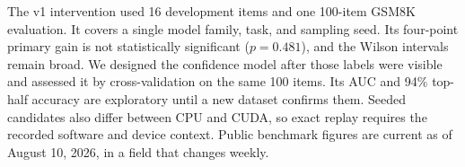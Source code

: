 The v1 intervention used 16 development items and one 100-item GSM8K
evaluation. It covers a single model family, task, and sampling seed. Its
four-point primary gain is not statistically significant ($p=0.481$), and the
Wilson intervals remain broad. We designed the confidence model after those
labels were visible and assessed it by cross-validation on the same 100 items.
Its AUC and 94\% top-half accuracy are exploratory until a new dataset confirms
them. Seeded candidates also differ between CPU and CUDA, so exact replay
requires the recorded software and device context. Public benchmark figures
are current as of August 10, 2026, in a field that changes weekly.
